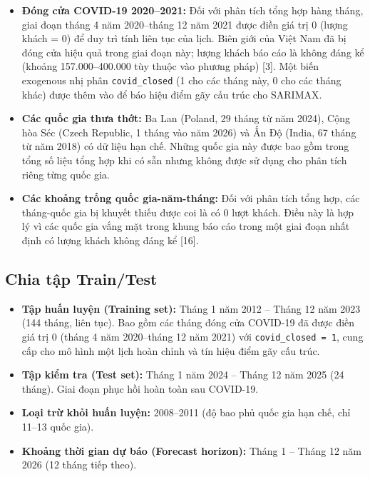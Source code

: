 \documentclass[
]{article}
\providecommand{\tightlist}{%
  \setlength{\itemsep}{0pt}\setlength{\parskip}{0pt}}
\begin{document}
\begin{itemize}
\tightlist
\item
  \textbf{Đóng cửa COVID-19 2020--2021:} Đối với phân tích tổng hợp hàng
  tháng, giai đoạn tháng 4 năm 2020--tháng 12 năm 2021 được điền giá trị
  0 (lượng khách = 0) để duy trì tính liên tục của lịch. Biên giới của
  Việt Nam đã bị đóng cửa hiệu quả trong giai đoạn này; lượng khách báo
  cáo là không đáng kể (khoảng 157.000--400.000 tùy thuộc vào phương
  pháp) {[}3{]}. Một biến exogenous nhị phân \texttt{covid\_closed} (1
  cho các tháng này, 0 cho các tháng khác) được thêm vào để báo hiệu
  điểm gãy cấu trúc cho SARIMAX.
\item
  \textbf{Các quốc gia thưa thớt:} Ba Lan (Poland, 29 tháng từ năm
  2024), Cộng hòa Séc (Czech Republic, 1 tháng vào năm 2026) và Ấn Độ
  (India, 67 tháng từ năm 2018) có dữ liệu hạn chế. Những quốc gia này
  được bao gồm trong tổng số liệu tổng hợp khi có sẵn nhưng không được
  sử dụng cho phân tích riêng từng quốc gia.
\item
  \textbf{Các khoảng trống quốc gia-năm-tháng:} Đối với phân tích tổng
  hợp, các tháng-quốc gia bị khuyết thiếu được coi là có 0 lượt khách.
  Điều này là hợp lý vì các quốc gia vắng mặt trong khung báo cáo trong
  một giai đoạn nhất định có lượng khách không đáng kể {[}16{]}.
\end{itemize}

\subsection{Chia tập Train/Test}\label{chia-tux1eadp-traintest}

\begin{itemize}
\tightlist
\item
  \textbf{Tập huấn luyện (Training set):} Tháng 1 năm 2012 -- Tháng 12
  năm 2023 (144 tháng, liên tục). Bao gồm các tháng đóng cửa COVID-19 đã
  được điền giá trị 0 (tháng 4 năm 2020--tháng 12 năm 2021) với
  \texttt{covid\_closed\ =\ 1}, cung cấp cho mô hình một lịch hoàn chỉnh
  và tín hiệu điểm gãy cấu trúc.
\item
  \textbf{Tập kiểm tra (Test set):} Tháng 1 năm 2024 -- Tháng 12 năm
  2025 (24 tháng). Giai đoạn phục hồi hoàn toàn sau COVID-19.
\item
  \textbf{Loại trừ khỏi huấn luyện:} 2008--2011 (độ bao phủ quốc gia hạn
  chế, chỉ 11--13 quốc gia).
\item
  \textbf{Khoảng thời gian dự báo (Forecast horizon):} Tháng 1 -- Tháng
  12 năm 2026 (12 tháng tiếp theo).
\end{itemize}
\end{document}
